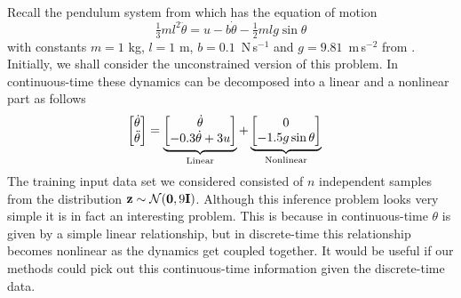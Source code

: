 Recall the pendulum system from  which has the equation of motion
\begin{equation}
\tfrac{1}{3}ml^2 \ddot{\theta} = u - b\dot\theta - \tfrac{1}{2}mlg\sin\theta
\end{equation}
with constants $m=1\!$ kg, $l=1\!$ m, $b = 0.1\!$~N$\,$s$^{-1}$ and $g=9.81\!$~m$\,$s$^{-2}$ from . Initially, we shall consider the unconstrained version of this problem. In continuous-time these dynamics can be decomposed into a linear and a nonlinear part as follows
\begin{align}
\begin{bmatrix} \dot\theta \\ \ddot\theta \end{bmatrix} &=
\underbrace{ \begin{bmatrix} \dot\theta \\ -0.3\dot\theta+3u \end{bmatrix} }_{\text{Linear}} +
\underbrace{ \begin{bmatrix} 0 \\ -1.5g\sin \theta \end{bmatrix} }_{\text{Nonlinear}}
\end{align}
The training input data set we considered consisted of $n$ independent samples from the distribution $\mathbf{z} \sim \mathcal{N}(\mathbf{0},9\mathbf{I})$. Although this inference problem looks very simple it is in fact an interesting problem. This is because in continuous-time $\theta$ is given by a simple linear relationship, but in discrete-time this relationship becomes nonlinear as the dynamics get coupled together. It would be useful if our methods could pick out this continuous-time information given the discrete-time data. 

